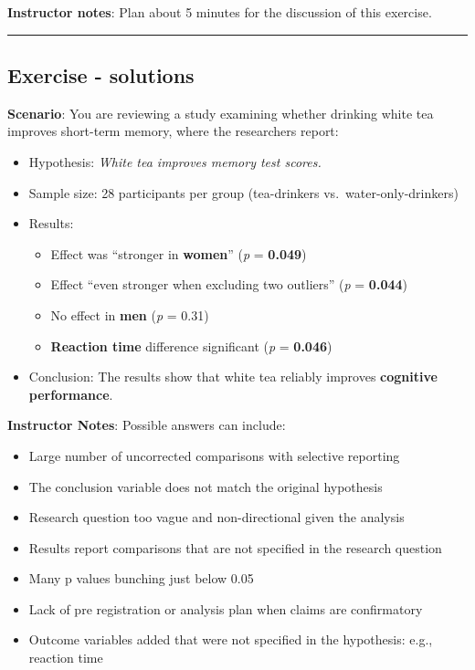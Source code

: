 \documentclass[
  english,
  letterpaper,
  DIV=11,
  numbers=noendperiod]{scrartcl}
\providecommand{\tightlist}{%
  \setlength{\itemsep}{0pt}\setlength{\parskip}{0pt}}
\begin{document}
\textbf{Instructor notes}: Plan about 5 minutes for the discussion of
this exercise.

\begin{center}\rule{0.5\linewidth}{0.5pt}\end{center}

\subsection{Exercise - solutions}\label{exercise---solutions}

\textbf{Scenario}: You are reviewing a study examining whether drinking
white tea improves short-term memory, where the researchers report:

\begin{itemize}
\item
  Hypothesis: \emph{White tea improves memory test scores.}
\item
  Sample size: 28 participants per group (tea-drinkers
  vs.~water-only-drinkers)
\item
  Results:

  \begin{itemize}
  \tightlist
  \item
    Effect was ``stronger in \textbf{women}'' (\emph{p} =
    \textbf{0.049})
  \item
    Effect ``even stronger when excluding two outliers'' (\emph{p} =
    \textbf{0.044})
  \item
    No effect in \textbf{men} (\emph{p} = 0.31)
  \item
    \textbf{Reaction time} difference significant (\emph{p} =
    \textbf{0.046})
  \end{itemize}
\item
  Conclusion: The results show that white tea reliably improves
  \textbf{cognitive performance}.
\end{itemize}

\textbf{Instructor Notes}: Possible answers can include:

\begin{itemize}
\tightlist
\item
  Large number of uncorrected comparisons with selective reporting
\item
  The conclusion variable does not match the original hypothesis
\item
  Research question too vague and non-directional given the analysis
\item
  Results report comparisons that are not specified in the research
  question
\item
  Many p values bunching just below 0.05
\item
  Lack of pre registration or analysis plan when claims are confirmatory
\item
  Outcome variables added that were not specified in the hypothesis:
  e.g., reaction time
\end{itemize}
\end{document}
